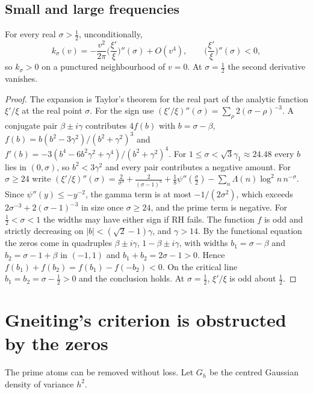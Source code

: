 \subsection{Small and large frequencies}

\begin{proposition}[proved]\label{n:prop:origin}
For every real $\sigma>\frac12$, unconditionally,
\[
k_\sigma(v)=-\frac{v^2}{2\pi}\Big(\frac{\xi'}{\xi}\Big)''(\sigma)+O(v^4),\qquad\Big(\frac{\xi'}{\xi}\Big)''(\sigma)<0,
\]
so $k_\sigma>0$ on a punctured neighbourhood of $v=0$. At $\sigma=\frac12$ the second derivative vanishes.
\end{proposition}

\begin{proof}
The expansion is Taylor's theorem for the real part of the analytic function $\xi'/\xi$ at the real point $\sigma$. For the sign use $(\xi'/\xi)''(\sigma)=\sum_\rho2(\sigma-\rho)^{-3}$. A conjugate pair $\beta\pm i\gamma$ contributes $4f(b)$ with $b=\sigma-\beta$, $f(b)=b(b^2-3\gamma^2)/(b^2+\gamma^2)^3$ and $f'(b)=-3(b^4-6b^2\gamma^2+\gamma^4)/(b^2+\gamma^2)^4$. For $1\le\sigma<\sqrt3\gamma_1\approx24.48$ every $b$ lies in $(0,\sigma)$, so $b^2<3\gamma^2$ and every pair contributes a negative amount. For $\sigma\ge24$ write $(\xi'/\xi)''(\sigma)=\frac2{\sigma^3}+\frac2{(\sigma-1)^3}+\frac18\psi''(\frac\sigma2)-\sum_n\Lambda(n)\log^2n\,n^{-\sigma}$. Since $\psi''(y)\le-y^{-2}$, the gamma term is at most $-1/(2\sigma^2)$, which exceeds $2\sigma^{-3}+2(\sigma-1)^{-3}$ in size once $\sigma\ge24$, and the prime term is negative. For $\frac12<\sigma<1$ the widths may have either sign if RH fails. The function $f$ is odd and strictly decreasing on $|b|<(\sqrt2-1)\gamma$, and $\gamma>14$. By the functional equation the zeros come in quadruples $\beta\pm i\gamma$, $1-\beta\pm i\gamma$, with widths $b_1=\sigma-\beta$ and $b_2=\sigma-1+\beta$ in $(-1,1)$ and $b_1+b_2=2\sigma-1>0$. Hence $f(b_1)+f(b_2)=f(b_1)-f(-b_2)<0$. On the critical line $b_1=b_2=\sigma-\frac12>0$ and the conclusion holds. At $\sigma=\frac12$, $\xi'/\xi$ is odd about $\frac12$.
\end{proof}

\section{Gneiting's criterion is obstructed by the zeros}\label{n:sec:obstruct}

The prime atoms can be removed without loss. Let $G_h$ be the centred Gaussian density of variance $h^2$.

